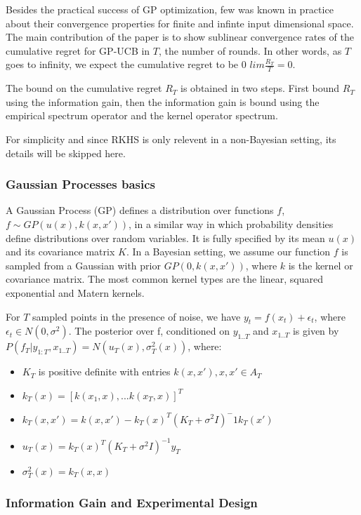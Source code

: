\documentclass[10pt,journal,a4paper]{IEEEtran}
\begin{document}
Besides the practical success of GP optimization, few was known in practice about their convergence properties for finite and infinte input dimensional space. The main contribution of the paper is to show sublinear convergence rates of the cumulative regret for GP-UCB in $T$, the number of rounds. In other words, as $T$ goes to infinity, we expect the cumulative regret to be 0 $lim \frac{R_T}{T} = 0$.

The bound on the cumulative regret $R_T$ is obtained in two steps. First bound $R_T$ using the information gain, then the information gain is bound using the empirical spectrum operator and the kernel operator spectrum.

For simplicity and since RKHS is only relevent in a non-Bayesian setting, its details will be skipped here.

\subsubsection{Gaussian Processes basics}
A Gaussian Process (GP) defines a distribution over functions $f$, $f \sim GP(u(x), k(x,x'))$, in a similar way in which probability densities define distributions over random variables. It is fully specified by its mean $u(x)$ and its covariance matrix $K$. In a Bayesian setting, we assume our function $f$ is sampled from a Gaussian with prior $GP(0, k(x,x'))$, where $k$ is the kernel or covariance matrix. The most common kernel types are the linear, squared exponential and Matern kernels.

For $T$ sampled points in the presence of noise, we have $y_t = f(x_t) + \epsilon_t$, where $\epsilon_t \in N(0,\sigma^2)$. The posterior over f, conditioned on $y_{1..T}$ and $x_{1..T}$ is given by
$P(f_T| y_{1:T},x_{1..T}) = N(u_T(x), \sigma_T^2(x))$, where: 
\begin{itemize}
	\item $K_T$ is positive definite with entries $k(x,x'), x,x' \in A_T$   
	\item $k_T(x) = [k(x_1,x),...k(x_T,x)]^T$	
	\item $k_{T}(x,x') = k(x,x') - k_T(x)^T(K_T+\sigma^2I)^-1k_T(x')$
	\item $u_{T}(x) = k_{T}(x)^{T}(K_T + \sigma^2I)^{-1} y_{T}$
	\item $\sigma_T^2(x) =  k_{T}(x,x)$
\end{itemize}

\subsubsection{Information Gain and Experimental Design}
\end{document}
